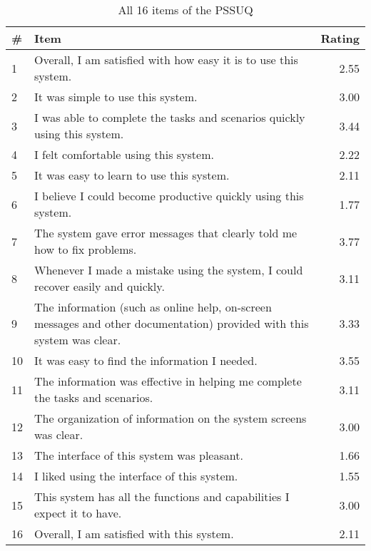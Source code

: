 \begin{table}[h!]
\centering
\begin{tabular}{|l|p{8cm}|r|}
\hline
\rowcolor[HTML]{EFEFEF}
\# & {\bf Item} & {\bf Rating} \\ \hline
1 & Overall, I am satisfied with how easy it is to use this system. & 2.55 \\ \hline
2 & It was simple to use this system. & 3.00 \\ \hline
3 & I was able to complete the tasks and scenarios quickly using this system. & 3.44 \\ \hline
4 & I felt comfortable using this system. & 2.22 \\ \hline
5 & It was easy to learn to use this system. & 2.11 \\ \hline
6 & I believe I could become productive quickly using this system. & 1.77 \\ \hline
7 & The system gave error messages that clearly told me how to fix problems. & 3.77 \\ \hline
8 & Whenever I made a mistake using the system, I could recover easily and quickly. & 3.11 \\ \hline
9 & The information (such as online help, on-screen messages and other documentation) provided with this system was clear. & 3.33 \\ \hline
10 & It was easy to find the information I needed. & 3.55 \\ \hline
11 & The information was effective in helping me complete the tasks and scenarios. & 3.11 \\ \hline
12 & The organization of information on the system screens was clear. & 3.00 \\ \hline
13 & The interface of this system was pleasant. & 1.66 \\ \hline
14 & I liked using the interface of this system. & 1.55 \\ \hline
15 & This system has all the functions and capabilities I expect it to have. & 3.00 \\ \hline
16 & Overall, I am satisfied with this system. & 2.11 \\ \hline
\end{tabular}
\caption{All 16 items of the PSSUQ}
\label{table:pssuq-items}
\end{table}
